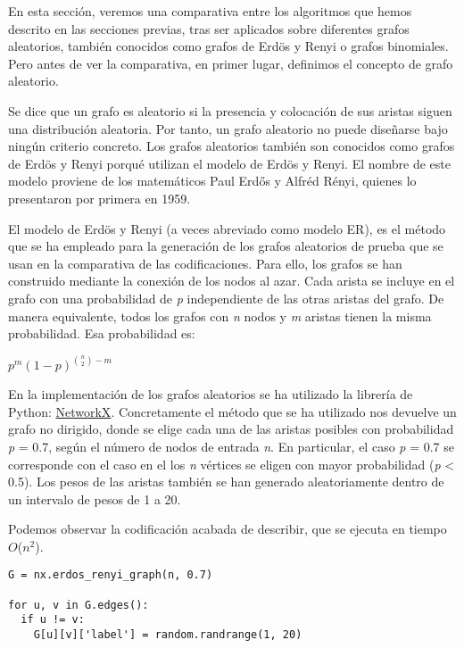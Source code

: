 En esta sección, veremos una comparativa entre los algoritmos que hemos descrito en las secciones previas, tras ser aplicados sobre diferentes grafos aleatorios, también conocidos como grafos de Erdös y Renyi\cite{ErdosRenyi} o grafos binomiales. Pero antes de ver la comparativa, en primer lugar, definimos el concepto de grafo aleatorio.

Se dice que un grafo es aleatorio si la presencia y colocación de sus aristas siguen una distribución aleatoria. Por tanto, un grafo aleatorio no puede diseñarse bajo ningún criterio concreto. Los grafos aleatorios también son conocidos como grafos de Erdös y Renyi porqué utilizan el modelo de Erdös y Renyi. El nombre de este modelo proviene de los matemáticos Paul Erdős y Alfréd Rényi, quienes lo presentaron por primera en 1959.

El modelo de Erdös y Renyi (a veces abreviado como modelo ER), es el método que se ha empleado para la generación de los grafos aleatorios de prueba que se usan en la comparativa de las codificaciones. Para ello, los grafos se han construido mediante la conexión de los nodos al azar. Cada arista se incluye en el grafo con una probabilidad de \textit{p} independiente de las otras aristas del grafo. De manera equivalente, todos los grafos con \textit{n} nodos y \textit{m} aristas tienen la misma probabilidad. Esa probabilidad es:

\begin{center}
	$p^m(1 - p)^{{n \choose 2} - m}$
\end{center}

En la implementación de los grafos aleatorios se ha utilizado la librería de Python:  \href{https://networkx.github.io/documentation/latest/reference/generated/networkx.generators.random\_graphs.erdos\_renyi\_graph.html?highlight=erdos\%20renyi#networkx.generators.random\_graphs.erdos\_renyi\_graph}{NetworkX}. Concretamente el método que se ha utilizado nos devuelve un grafo no dirigido, donde se elige cada una de las aristas posibles con probabilidad \textit{p} = 0.7, según el número de nodos de entrada \textit{n}. En particular, el caso \textit{p} = 0.7 se corresponde con el caso en el los \textit{n} vértices se eligen con mayor probabilidad (\textit{p} < 0.5). Los pesos de las aristas también se han generado aleatoriamente dentro de un intervalo de pesos de 1 a 20.

Podemos observar la codificación acabada de describir, que se ejecuta en tiempo $O$($n^2$).

\lstset{language=Python}    
\begin{lstlisting}[frame=single]  
G = nx.erdos_renyi_graph(n, 0.7)

for u, v in G.edges():
  if u != v:
    G[u][v]['label'] = random.randrange(1, 20)
\end{lstlisting}

